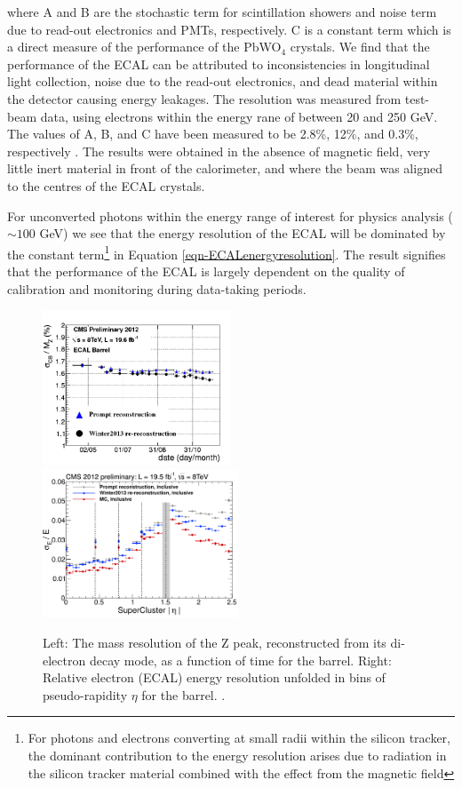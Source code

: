 where A and B are the stochastic term for scintillation showers and noise term due to read-out electronics and PMTs, respectively. C is a constant term which is a direct measure of the performance of the PbWO$_4$ crystals. We find that the performance of the ECAL can be attributed to inconsistencies in longitudinal light collection, noise due to the read-out electronics, and dead material within the detector causing energy leakages. The resolution was measured from test-beam data, using electrons within the energy rane of between 20 and 250 GeV. The values of A, B, and C have been measured to be 2.8\%, 12\%, and 0.3\%, respectively \cite{CMSexperiment}. The results were obtained in the absence of magnetic field, very little inert material in front of the calorimeter, and where the beam was aligned to the centres of the ECAL crystals. 

For unconverted photons within the energy range of interest for physics analysis ($\sim100$ GeV) we see that the energy resolution of the ECAL will be dominated by the constant term\footnote{For photons and electrons converting at small radii within the silicon tracker, the dominant contribution to the energy resolution arises due to radiation in the silicon tracker material combined with the effect from the magnetic field} in Equation \ref{eqn-ECALenergyresolution}. The result signifies that the performance of the ECAL is largely dependent on the quality of calibration and monitoring during data-taking periods. 

\begin{figure} 
\includegraphics[width=0.50\textwidth]{Figures/EcalInvariantMass.png}
\includegraphics[width=0.52\textwidth]{Figures/EcalEtaInclusive.png}
\caption{Left: The mass resolution of the Z peak, reconstructed from its di-electron decay mode, as a function of time for the barrel. Right: Relative electron (ECAL) energy resolution unfolded in bins of pseudo-rapidity $\eta$ for the barrel. \cite{ECALPerformance}.}
\label{fig-ECALperformance}
\end{figure}



